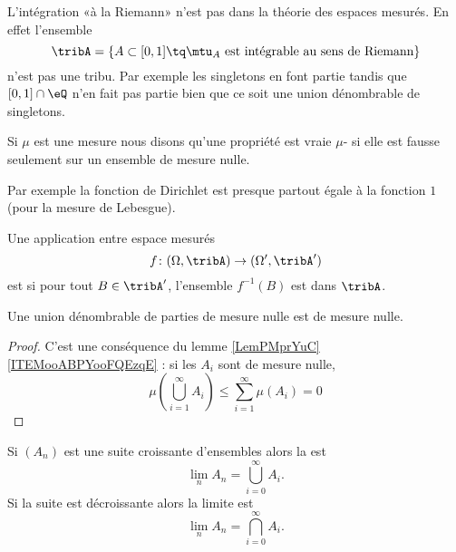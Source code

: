 \begin{example}
	L'intégration «à la Riemann» n'est pas dans la théorie des espaces mesurés. En effet l'ensemble
	\begin{equation}
		\tribA=\{   A\subset\mathopen[ 0 , 1 \mathclose]\tq   \mtu_A\text{ est intégrable au sens de Riemann}   \}
	\end{equation}
	n'est pas une tribu. Par exemple les singletons en font partie tandis que \( \mathopen[ 0 , 1 \mathclose]\cap \eQ\) n'en fait pas partie bien que ce soit une union dénombrable de singletons.
\end{example}

\begin{definition}
	Si \( \mu\) est une mesure nous disons qu'une propriété est vraie \( \mu\)- si elle est fausse seulement sur un ensemble de mesure nulle.
\end{definition}

Par exemple la fonction de Dirichlet est presque partout égale à la fonction \( 1\) (pour la mesure de Lebesgue).

\begin{definition}
	Une application entre espace mesurés
	\begin{equation}
		f\colon (\Omega,\tribA)\to (\Omega',\tribA')
	\end{equation}
	est  si pour tout \( B\in\tribA'\), l'ensemble \( f^{-1}(B)\) est dans \( \tribA\).
\end{definition}

\begin{lemma}   \label{LemIDITgAy}
	Une union dénombrable de parties de mesure nulle est de mesure nulle.
\end{lemma}

\begin{proof}
	C'est une conséquence du lemme \ref{LemPMprYuC}\ref{ITEMooABPYooFQEzqE} : si les \( A_i\) sont de mesure nulle,
	\begin{equation}
		\mu\left( \bigcup_{i=1}^{\infty}A_i \right)\leq\sum_{i=1}^{\infty} \mu(A_i)=0
	\end{equation}
\end{proof}

\begin{definition}
	Si \( (A_n)\) est une suite croissante d'ensembles alors la  est
	\begin{equation}
		\lim_nA_n=\bigcup_{i=0}^{\infty}A_i.
	\end{equation}
	Si la suite est décroissante alors la limite est
	\begin{equation}
		\lim_nA_n=\bigcap_{i=0}^{\infty}A_i.
	\end{equation}
\end{definition}

